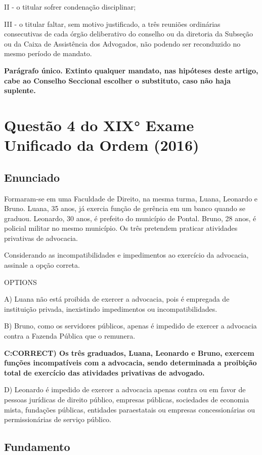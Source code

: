 \documentclass[12pt]{article}
\begin{document}
II - o titular sofrer condenação disciplinar;

III - o titular faltar, sem motivo justificado, a três reuniões ordinárias consecutivas de cada órgão deliberativo do conselho ou da diretoria da Subseção ou da Caixa de Assistência dos Advogados, não podendo ser reconduzido no mesmo período de mandato.

\textbf{Parágrafo único. Extinto qualquer mandato, nas hipóteses deste artigo, cabe ao Conselho Seccional escolher o substituto, caso não haja suplente.
}

\section{Questão 4 do XIX° Exame Unificado da Ordem (2016)}


\subsection{Enunciado}
Formaram-se em uma Faculdade de Direito, na mesma turma, 
Luana, Leonardo e Bruno. Luana, 35 anos, já exercia função de 
gerência em um banco quando se graduou. Leonardo, 30 
anos, é prefeito do município de Pontal. Bruno, 28 anos, é 
policial militar no mesmo município. Os três pretendem 
praticar atividades privativas de advocacia.  
 
Considerando as incompatibilidades e impedimentos ao 
exercício da advocacia, assinale a opção correta. 
 
OPTIONS

A) Luana não está proibida de exercer a advocacia, pois é 
empregada de instituição privada, inexistindo 
impedimentos ou incompatibilidades. 

B) Bruno, como os servidores públicos, apenas é impedido de 
exercer a advocacia contra a Fazenda Pública que o 
remunera. 

\textbf{C:CORRECT) Os três graduados, Luana, Leonardo e Bruno, exercem 
funções incompatíveis com a advocacia, sendo 
determinada a proibição total de exercício das atividades 
privativas de advogado. }

D) Leonardo é impedido de exercer a advocacia apenas 
contra ou em favor de pessoas jurídicas de direito público, 
empresas públicas, sociedades de economia mista, 
fundações públicas, entidades paraestatais ou empresas 
concessionárias ou permissionárias de serviço público. 

\subsection{Fundamento}
\end{document}

